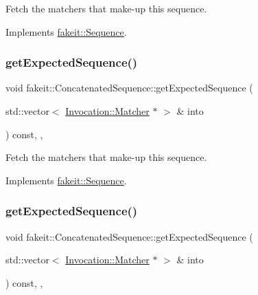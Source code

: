 Fetch the matchers that make-\/up this sequence. 



Implements \mbox{\hyperlink{classfakeit_1_1Sequence_aa1a1e4ad2fcac3379ba38f250bf06884}{fakeit\+::\+Sequence}}.

\mbox{\label{classfakeit_1_1ConcatenatedSequence_a176b1d4dac2e552f646c2c3ce98f0d1f}} 
\subsubsection{\texorpdfstring{getExpectedSequence()}{getExpectedSequence()}\hspace{0.1cm}{\footnotesize\ttfamily [5/9]}}
{\footnotesize\ttfamily void fakeit\+::\+Concatenated\+Sequence\+::get\+Expected\+Sequence (\begin{DoxyParamCaption}\item[{std\+::vector$<$ \mbox{\hyperlink{structfakeit_1_1Invocation_1_1Matcher}{Invocation\+::\+Matcher}} $\ast$ $>$ \&}]{into }\end{DoxyParamCaption}) const\hspace{0.3cm}{\ttfamily [inline]}, {\ttfamily [override]}, {\ttfamily [virtual]}}



Fetch the matchers that make-\/up this sequence. 



Implements \mbox{\hyperlink{classfakeit_1_1Sequence_aa1a1e4ad2fcac3379ba38f250bf06884}{fakeit\+::\+Sequence}}.

\mbox{\label{classfakeit_1_1ConcatenatedSequence_a176b1d4dac2e552f646c2c3ce98f0d1f}} 
\subsubsection{\texorpdfstring{getExpectedSequence()}{getExpectedSequence()}\hspace{0.1cm}{\footnotesize\ttfamily [6/9]}}
{\footnotesize\ttfamily void fakeit\+::\+Concatenated\+Sequence\+::get\+Expected\+Sequence (\begin{DoxyParamCaption}\item[{std\+::vector$<$ \mbox{\hyperlink{structfakeit_1_1Invocation_1_1Matcher}{Invocation\+::\+Matcher}} $\ast$ $>$ \&}]{into }\end{DoxyParamCaption}) const\hspace{0.3cm}{\ttfamily [inline]}, {\ttfamily [override]}, {\ttfamily [virtual]}}



